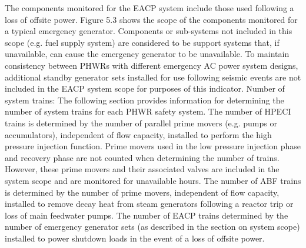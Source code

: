 The components monitored for the EACP system include those used following a loss of offsite power. Figure 5.3 shows the scope of the components monitored for a typical emergency generator. Components or sub-systems not included in this scope (e.g. fuel supply system) are considered to be support systems that, if unavailable, can cause the emergency generator to be unavailable. To maintain consistency between PHWRs with different emergency AC power system designs, additional standby generator sets installed for use following seismic events are not included in the EACP system scope for purposes of this indicator.
Number of system trains: The following section provides information for determining the number of system trains for each PHWR safety system.
The number of HPECI trains is determined by the number of parallel prime movers (e.g. pumps or accumulators), independent of flow capacity, installed to perform the high pressure injection function. Prime movers used in the low pressure injection phase and recovery phase are not counted when determining the number of trains. However, these prime movers and their associated valves are included in the system scope and are monitored for unavailable hours. The number of ABF trains is determined by the number of prime movers, independent of flow capacity, installed to remove decay heat from steam generators following a reactor trip or loss of main feedwater pumps.
The number of EACP trains determined by the number of emergency generator sets (as described in the section on system scope) installed to power shutdown loads in the event of a loss of offsite power.






